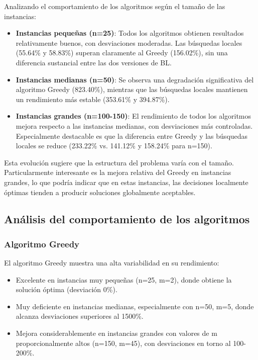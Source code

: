 \documentclass{article}
\begin{document}
Analizando el comportamiento de los algoritmos según el tamaño de las instancias:

\begin{itemize}
    \item \textbf{Instancias pequeñas (n=25)}: Todos los algoritmos obtienen resultados relativamente buenos, con desviaciones moderadas. Las búsquedas locales (55.64\% y 58.83\%) superan claramente al Greedy (156.02\%), sin una diferencia sustancial entre las dos versiones de BL.
    
    \item \textbf{Instancias medianas (n=50)}: Se observa una degradación significativa del algoritmo Greedy (823.40\%), mientras que las búsquedas locales mantienen un rendimiento más estable (353.61\% y 394.87\%).
    
    \item \textbf{Instancias grandes (n=100-150)}: El rendimiento de todos los algoritmos mejora respecto a las instancias medianas, con desviaciones más controladas. Especialmente destacable es que la diferencia entre Greedy y las búsquedas locales se reduce (233.22\% vs. 141.12\% y 158.24\% para n=150).
\end{itemize}

Esta evolución sugiere que la estructura del problema varía con el tamaño. Particularmente interesante es la mejora relativa del Greedy en instancias grandes, lo que podría indicar que en estas instancias, las decisiones localmente óptimas tienden a producir soluciones globalmente aceptables.

\subsection{Análisis del comportamiento de los algoritmos}

\subsubsection{Algoritmo Greedy}

El algoritmo Greedy muestra una alta variabilidad en su rendimiento:

\begin{itemize}
    \item Excelente en instancias muy pequeñas (n=25, m=2), donde obtiene la solución óptima (desviación 0\%).
    \item Muy deficiente en instancias medianas, especialmente con n=50, m=5, donde alcanza desviaciones superiores al 1500\%.
    \item Mejora considerablemente en instancias grandes con valores de m proporcionalmente altos (n=150, m=45), con desviaciones en torno al 100-200\%.
\end{itemize}
\end{document}
